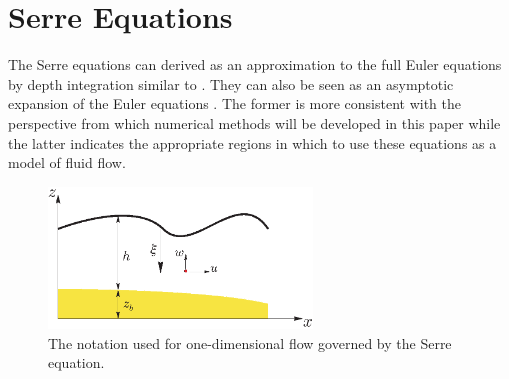 \documentclass[SingleSpace,12pt,Proceedings]{Serre_ASCE}
\begin{document}
\section{Serre Equations}
\label{section:Serre Equations}
The Serre equations can derived as an approximation to the full Euler equations by depth integration similar to . They can also be seen as an asymptotic expansion of the Euler equations \cite{Bonneton-Lannes-2009-16601}. The former is more consistent with the perspective from which numerical methods will be developed in this paper while the latter indicates the appropriate regions in which to use these equations as a model of fluid flow.
\begin{figure}
\begin{center}
\includegraphics[width=7.0cm]{one-dimensional-axis_Serre.eps}
\end{center}
\caption{The notation used for one-dimensional flow governed by the Serre equation.}
\label{fig:Notation}
\end{figure}
\end{document}
